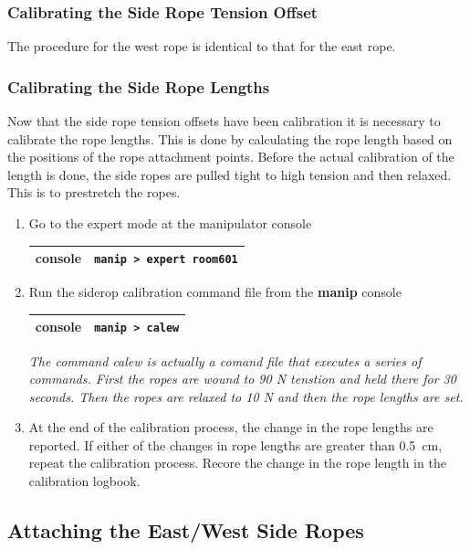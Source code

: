 \documentclass[11pt]{article}
\begin{document}
\subsubsection{Calibrating the Side Rope Tension Offset}
The procedure for the west rope is identical to that for the east rope.

\subsubsection{Calibrating the Side Rope Lengths}
Now that the side rope tension offsets have been calibration it is necessary to calibrate the rope lengths. This is done by calculating the rope length based on the positions of the rope attachment points. Before the actual calibration of the length is done, the side ropes are pulled tight to high tension and then relaxed. This is to prestretch the ropes.
\begin{enumerate}
\item \CheckBox[name=csrl1]{} Go to the expert mode at the manipulator console
\begin{center}
\begin{tabular}{|c|c|}
\hline
console & \verb+manip > expert room601+\\
\hline
\end{tabular}
\end{center}
\item \CheckBox[name=csrl2]{} Run the siderop calibration command file from the {\bf manip} console
\begin{center}
\begin{tabular}{|c|c|}
\hline
console & \verb+manip > calew+\\
\hline
\end{tabular}
\end{center}
{\it The command calew is actually a comand file that executes a series of commands. First the ropes are wound to 90 N tenstion and held there for 30 seconds. Then the ropes are relaxed to 10 N and then the rope lengths are set.}
\item \CheckBox[name=csrl3] At the end of the calibration process, the change in the rope lengths are reported. If either of the changes in rope lengths are greater than 0.5~cm, repeat the calibration process. Recore the change in the rope length in the calibration logbook.
\end{enumerate}

\subsection{Attaching the East/West Side Ropes}
\end{document}
